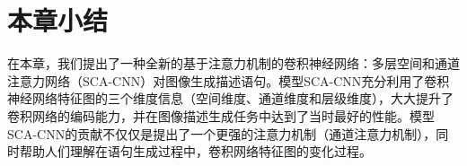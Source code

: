 \section{本章小结}

在本章，我们提出了一种全新的基于注意力机制的卷积神经网络：多层空间和通道注意力网络（SCA-CNN）对图像生成描述语句。模型SCA-CNN充分利用了卷积神经网络特征图的三个维度信息（空间维度、通道维度和层级维度），大大提升了卷积网络的编码能力，并在图像描述生成任务中达到了当时最好的性能。模型SCA-CNN的贡献不仅仅是提出了一个更强的注意力机制（通道注意力机制），同时帮助人们理解在语句生成过程中，卷积网络特征图的变化过程。